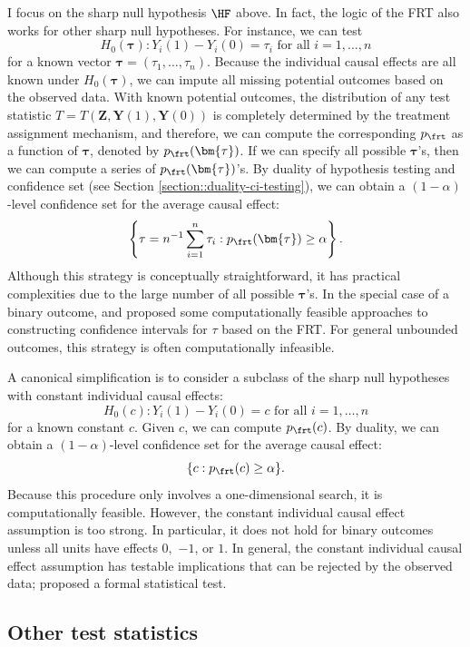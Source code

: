 I focus on the sharp null hypothesis $\HF$ above. In fact, the logic of the FRT also works for other sharp null hypotheses. For instance, we can test
$$
H_0(\bm{\tau}): Y_i(1) - Y_i(0) = \tau_i \text{ for all } i=1,\ldots, n
$$
for a known vector $\bm{\tau} = (\tau_1, \ldots, \tau_n)$. Because the individual causal effects are all known under $H_0(\bm{\tau})$, we can impute all missing potential outcomes based on the observed data. With known potential outcomes, the distribution of any test statistic $T = T(\bm{Z}, \bm{Y}(1), \bm{Y}(0))$ is completely determined by the treatment assignment mechanism, and therefore, we can compute the corresponding $p_\frt$ as a function of $\bm{\tau} $, denoted by $p_\frt(\bm{\tau} )$. If we can specify all possible $\bm{\tau}$'s, then we can compute a series of $p_\frt(\bm{\tau} )$'s. By duality of hypothesis testing and confidence set (see Section \ref{section::duality-ci-testing}), we can obtain a $(1-\alpha)$-level confidence set for the average causal effect:
$$
\left \{ \tau = n^{-1}\sum_{i=1}^n \tau_i :  p_\frt(\bm{\tau} ) \geq \alpha \right \} .
$$
Although this strategy is conceptually straightforward, it has practical complexities due to the large number of all possible $\bm{\tau}$'s. In the special case of a binary outcome, \citet{Rigdon:2015} and \citet{li2016exact} proposed some computationally feasible approaches to constructing confidence intervals for $\tau$ based on the FRT. For general unbounded outcomes, this strategy is often computationally infeasible. 


A canonical simplification \citep{rosenbaum2002design, Rosenbaum:2010} is to consider a subclass of the sharp null hypotheses with constant individual causal effects:
$$
H_0(c): Y_i(1) - Y_i(0) =  c\text{ for all } i=1,\ldots, n
$$
for a known constant $c$. Given $c$, we can compute $p_\frt(c)$. By duality, we can obtain 
a $(1-\alpha)$-level confidence set for the average causal effect:
$$
\{ c :  p_\frt(c ) \geq \alpha \} .
$$
Because this procedure only involves a one-dimensional search, it is computationally feasible. 
However, the constant individual causal effect assumption is too strong. In particular, it does not hold for binary outcomes unless all units have effects $0,$ $-1$, or $1$. In general, the constant individual causal effect assumption has testable implications that can be rejected by the observed data; \citet{ding2015randomization} proposed a formal statistical test. 



\subsection{Other test statistics}\label{section::other-statistic}


